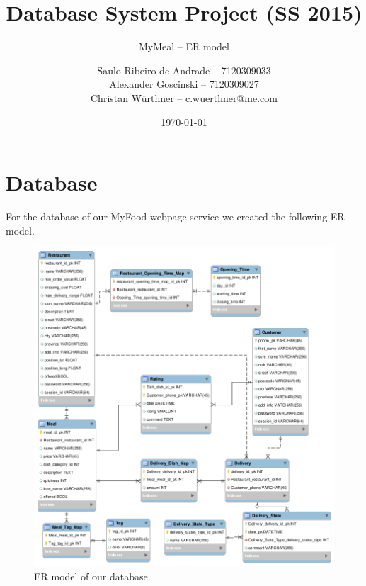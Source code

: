 \documentclass[parskip=half, a4paper, DIV=28]{scrartcl}
\begin{document}
\title{Database System Project (SS 2015)}
\subtitle{MyMeal -- ER model}
\author{Saulo Ribeiro de Andrade -- 7120309033\\
		Alexander Goscinski -- 7120309027\\
		Christan W\"{u}rthner -- c.wuerthner@me.com}
\date{\today}
\maketitle

\section{Database}
For the database of our MyFood webpage service we created the following ER model. 
\begin{figure}[h!]
	\centering
		\includegraphics[scale=0.5]{er_model.png}
	\caption{ER model of our database.}
\end{figure}
\end{document}
